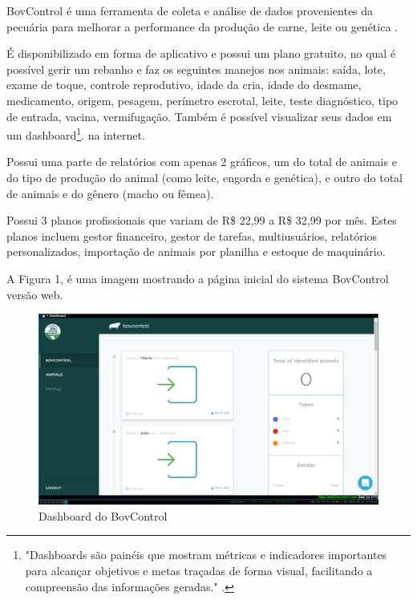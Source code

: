 \documentclass[12pt]{article}
\begin{document}
\begin{titlepage}
\begin{center}
BovControl é uma ferramenta de coleta e análise de dados provenientes da pecuária para melhorar a performance da produção de carne, leite ou genética \cite{bovcontrol10}. 

É disponibilizado em forma de aplicativo e possui um plano gratuito, no qual é possível gerir um rebanho e faz os seguintes manejos nos animais: saída, lote, exame de toque, controle reprodutivo, idade da cria, idade do desmame, medicamento, origem, pesagem, perímetro escrotal, leite, teste diagnóstico, tipo de entrada, vacina, vermifugação. Também é possível visualizar seus dados em um dashboard\footnote{"Dashboards são painéis que mostram métricas e indicadores importantes para alcançar objetivos e metas traçadas de forma visual, facilitando a compreensão das informações geradas." \cite{nascimento17}.}. na internet.

Possui uma parte de relatórios com apenas 2 gráficos, um do total de animais e do tipo de produção do animal (como leite, engorda e genética), e outro do total de animais e do gênero (macho ou fêmea). 

Possui 3 planos profissionais que variam de R\$ 22,99 a R\$ 32,99 por mês. Estes planos incluem gestor financeiro, gestor de tarefas, multiusuários, relatórios personalizados, importação de animais por planilha e estoque de maquinário.  

A Figura 1, é uma imagem mostrando a página inicial do sistema BovControl versão web.

\begin{figure}[!h]
	\begin{center}
		\caption{Dashboard do BovControl}
		\includegraphics[width=6in]{img/bovcontrol.png}

	\end{center}
\end{figure}



\end{center}
\end{titlepage}
\end{document}
